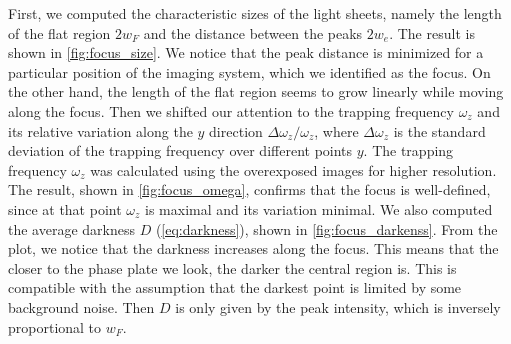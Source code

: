 First, we computed the characteristic sizes of the light sheets, namely the length of the flat region $2w_F$ and the distance between the peaks $2w_e$. The result is shown in \cref{fig:focus_size}. We notice that the peak distance is minimized for a particular position of the imaging system, which we identified as the focus. On the other hand, the length of the flat region seems to grow linearly while moving along the focus. Then we shifted our attention to the trapping frequency $\omega_z$ and its relative variation along the $y$ direction $\Delta \omega_z/\omega_z$, where $\Delta \omega_z$ is the standard deviation of the trapping frequency over different points $y$. The trapping frequency $\omega_z$ was calculated using the overexposed images for higher resolution. The result, shown in \cref{fig:focus_omega}, confirms that the focus is well-defined, since at that point $\omega_z$ is maximal and its variation minimal. We also computed the average darkness $D$ (\cref{eq:darkness}), shown in \cref{fig:focus_darkenss}. From the plot, we notice that the darkness increases along the focus. This means that the closer to the phase plate we look, the darker the central region is. This is compatible with the assumption that the darkest point is limited by some background noise. Then $D$ is only given by the peak intensity, which is inversely proportional to $w_F$.

